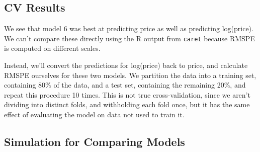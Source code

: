 \documentclass[]{book}
\begin{document}
\subsection{CV Results}\label{cv-results-1}

We see that model 6 was best at predicting price as well as predicting
log(price). We can't compare these directly using the R output from
\texttt{caret} because RMSPE is computed on different scales.

Instead, we'll convert the predictions for log(price) back to price, and
calculate RMSPE ourselves for these two models. We partition the data
into a training set, containing 80\% of the data, and a test set,
containing the remaining 20\%, and repeat this procedure 10 times. This
is not true cross-validation, since we aren't dividing into distinct
folds, and withholding each fold once, but it has the same effect of
evaluating the model on data not used to train it.

\subsection{Simulation for Comparing
Models}\label{simulation-for-comparing-models}
\end{document}
